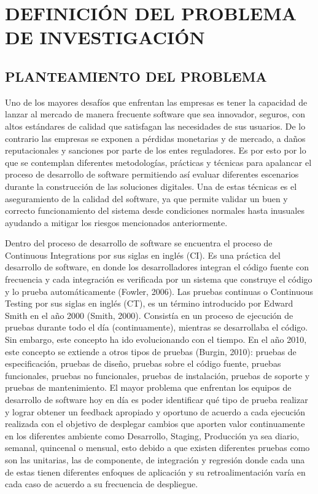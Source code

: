 \section{DEFINICIÓN DEL PROBLEMA DE INVESTIGACIÓN}

\subsection{PLANTEAMIENTO DEL PROBLEMA}
Uno de los mayores desafíos que enfrentan las empresas es tener la capacidad de lanzar al mercado de manera frecuente software que sea innovador, seguros, con altos estándares de calidad que satisfagan las necesidades de sus usuarios. De lo contrario las empresas se exponen a pérdidas monetarias y de mercado, a daños reputacionales y sanciones por parte de los entes reguladores. Es por esto por lo que se contemplan diferentes metodologías, prácticas y técnicas para apalancar el proceso de desarrollo de software permitiendo así evaluar diferentes escenarios durante la construcción de las soluciones digitales. Una de estas técnicas es el aseguramiento de la calidad del software, ya que permite validar un buen y correcto funcionamiento del sistema desde condiciones normales hasta inusuales ayudando a mitigar los riesgos mencionados anteriormente.

Dentro del proceso de desarrollo de software se encuentra el proceso de Continuous Integrations por sus siglas en inglés (CI). Es una práctica del desarrollo de software, en donde los desarrolladores integran el código fuente con frecuencia y cada integración  es  verificada por un sistema que construye el código y lo prueba automáticamente (Fowler, 2006). Las pruebas continuas o Continuous Testing  por sus siglas en inglés (CT), es un término introducido por Edward Smith en el año 2000 (Smith, 2000). Consistía  en  un  proceso de ejecución de pruebas durante todo el día (continuamente), mientras se desarrollaba el código. Sin embargo, este concepto ha ido evolucionando con el tiempo. En  el año 2010, este concepto se extiende a otros tipos de pruebas (Burgin, 2010): pruebas de especificación, pruebas de diseño, pruebas sobre el código  fuente,  pruebas funcionales,  pruebas no funcionales, pruebas de instalación, pruebas de soporte y pruebas de mantenimiento. El mayor problema que enfrentan los equipos de desarrollo de software  hoy en día es poder identificar qué tipo de prueba realizar y lograr obtener un feedback apropiado y oportuno de acuerdo a cada ejecución realizada con el objetivo de desplegar cambios que aporten valor continuamente en los diferentes ambiente como Desarrollo, Staging, Producción ya sea diario, semanal, quincenal o mensual, esto debido a que existen diferentes pruebas como son las unitarias, las de componente, de integración y regresión donde cada una de estas tienen diferentes enfoques de aplicación y su retroalimentación varía en cada caso de acuerdo a su frecuencia de despliegue.

